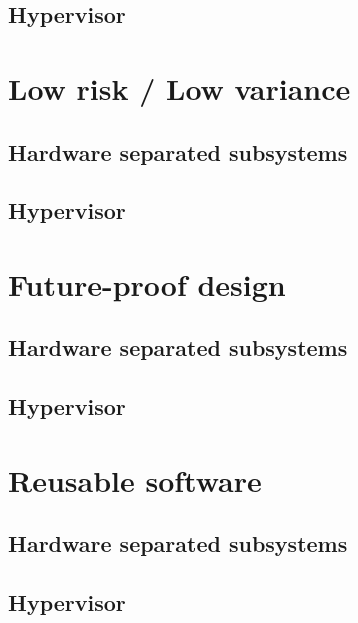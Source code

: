 \subsection{Hypervisor}


\section{Low risk / Low variance}
\subsection{Hardware separated subsystems}
\subsection{Hypervisor}


\section{Future-proof design}
\subsection{Hardware separated subsystems}
\subsection{Hypervisor}


\section{Reusable software}
\subsection{Hardware separated subsystems}
\subsection{Hypervisor}


